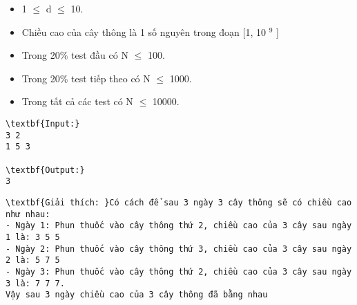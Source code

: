 \begin{itemize}
	\item 1  $\le$  d  $\le$  10.
	\item Chiều cao của cây thông là 1 số nguyên trong đoạn [1, 10 $^ 9 $ ]
	\item Trong 20\% test đầu có N  $\le$  100.
	\item Trong 20\% test tiếp theo có N  $\le$  1000.
	\item Trong tất cả các test có N  $\le$  10000.
\end{itemize}
\begin{verbatim}
\textbf{Input:}
3 2
1 5 3

\textbf{Output:}
3\end{verbatim}
\begin{verbatim}
\textbf{Giải thích: }Có cách để sau 3 ngày 3 cây thông sẽ có chiều cao như nhau:
- Ngày 1: Phun thuốc vào cây thông thứ 2, chiều cao của 3 cây sau ngày 1 là: 3 5 5
- Ngày 2: Phun thuốc vào cây thông thứ 3, chiều cao của 3 cây sau ngày 2 là: 5 7 5
- Ngày 3: Phun thuốc vào cây thông thứ 2, chiều cao của 3 cây sau ngày 3 là: 7 7 7.
Vậy sau 3 ngày chiều cao của 3 cây thông đã bằng nhau\end{verbatim}